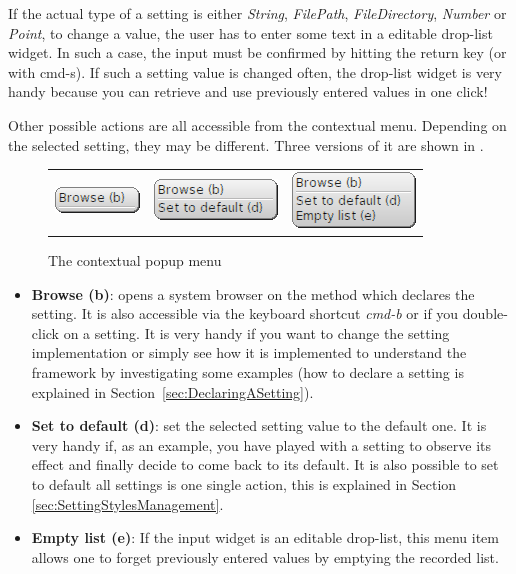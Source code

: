 \documentclass[a4paper,10pt,twoside]{book}
\begin{document}
If the actual type of a setting is either \textit{String}, \textit{FilePath}, \textit{FileDirectory}, \textit{Number} or \textit{Point},  to change a value, the user has to enter some text in a editable drop-list widget. In such a case, the input must be confirmed by hitting the return key (or with cmd-s). If such a setting value is changed often, the drop-list widget is very handy because you can retrieve and use previously entered values in one click!

Other possible actions are all accessible from the contextual menu.
Depending on the selected setting, they may be different. Three versions of it are shown in .
\begin{figure}[tbh]
\begin{center}
\begin{tabular}{ccc}
\includegraphics[scale=0.5]{popup0.png} & 
	\includegraphics[scale=0.5]{popup1.png} & 
	\includegraphics[scale=0.5]{popup2.png} \\ 
\end{tabular} 
\caption{The contextual popup menu}
\end{center}
\end{figure}
\begin{itemize}
\item \textbf{Browse (b)}: opens a system browser on the method which declares the setting. It is also accessible via the keyboard shortcut \textit{cmd-b} or if you double-click on a setting. It is very handy if you want to change the setting implementation or simply see how it is implemented to understand the framework by investigating some examples (how to declare a setting is explained in Section~\ref{sec:DeclaringASetting}).
\item \textbf{Set to default (d)}: set the selected setting value to the default one. It is very handy if, as an example, you have played with a setting to observe its effect and finally decide to come back to its default. It is also possible to set to default all settings is one single action, this is explained in Section \ref{sec:SettingStylesManagement}.
\item \textbf{Empty list (e)}: If the input widget is an editable drop-list, this menu item allows one to forget previously entered values by emptying the recorded list.
\end{itemize}
\end{document}
